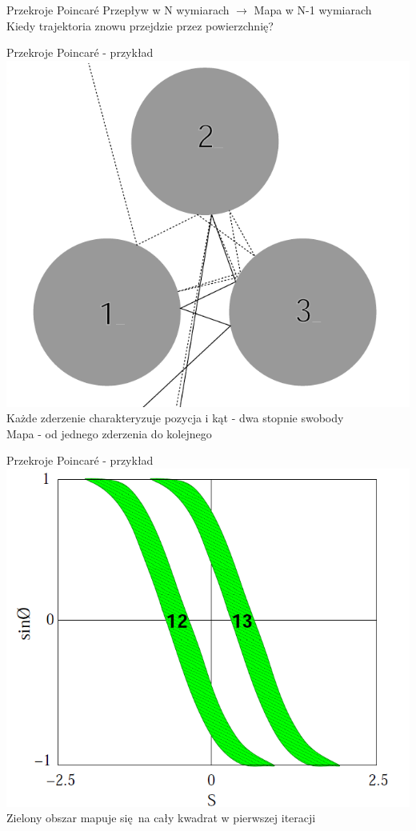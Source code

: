 \documentclass{beamer}
\begin{document}
\begin{frame}{Przekroje Poincaré} \pause
Przepływ w N wymiarach $\rightarrow$ Mapa w N-1 wymiarach\\ \pause
Kiedy trajektoria znowu przejdzie przez powierzchnię?\\ \pause
\end{frame}

\begin{frame}{Przekroje Poincaré - przykład}
\centering
\includegraphics[height=0.7\textheight]{pinball}\\
Każde zderzenie charakteryzuje pozycja i kąt - dwa stopnie swobody\\
Mapa - od jednego zderzenia do kolejnego
\end{frame}

\begin{frame}{Przekroje Poincaré - przykład}
\centering
\includegraphics[height=0.7\textheight]{poincare_section}\\
Zielony obszar mapuje się na cały kwadrat w pierwszej iteracji
\end{frame}
\end{document}
